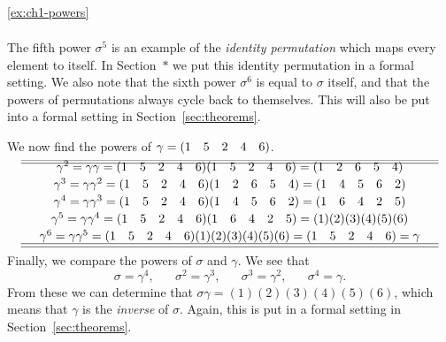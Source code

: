 \begin{solution}{\ref{ex:ch1-powers}}
{\[\begin{array}{c}
    \end{array}
    \]
    The fifth power \(\sigma^{5}\) is an example of the \textit{identity permutation} which maps every element to itself. In Section~\(*\) we put this identity permutation in a formal setting. We also note that the sixth power \(\sigma^{6}\) is equal to \(\sigma\) itself, and that the powers of permutations always cycle back to themselves. This will also be put into a formal setting in Section~\ref{sec:theorems}.

    We now find the powers of \(\gamma = (1 \quad 5 \quad 2 \quad 4 \quad 6)\).
    \[
    \begin{array}{c}\hline\\[-15pt]\hline\\[-12pt]
        \quad\gamma^{2} = \gamma\gamma = (1 \quad 5 \quad 2 \quad 4 \quad 6)(1 \quad 5 \quad 2 \quad 4 \quad 6) = (1 \quad 2 \quad 6 \quad 5 \quad 4)\quad \\[2pt]
        \quad\gamma^{3} = \gamma\gamma^{2} = (1 \quad 5 \quad 2 \quad 4 \quad 6)(1 \quad 2 \quad 6 \quad 5 \quad 4) = (1 \quad 4 \quad 5 \quad 6 \quad 2)\quad \\[2pt]
        \quad\gamma^{4} = \gamma\gamma^{3} = (1 \quad 5 \quad 2 \quad 4 \quad 6)(1 \quad 4 \quad 5 \quad 6 \quad 2) = (1 \quad 6 \quad 4 \quad 2 \quad 5)\quad \\[2pt]
        \quad\gamma^{5} = \gamma\gamma^{4} = (1 \quad 5 \quad 2 \quad 4 \quad 6)(1 \quad 6 \quad 4 \quad 2 \quad 5) = (1)(2)(3)(4)(5)(6)\quad \\[2pt]
        \quad\gamma^{6} = \gamma\gamma^{5} = (1 \quad 5 \quad 2 \quad 4 \quad 6)(1)(2)(3)(4)(5)(6) = (1 \quad 5 \quad 2 \quad 4 \quad 6) = \gamma\quad \\[2pt]
        \hline\\[-15pt]\hline
    \end{array}
    \]
    Finally, we compare the powers of \(\sigma\) and \(\gamma\). We see that
    \[
    \sigma = \gamma^{4}, \hspace{20pt} \sigma^{2} = \gamma^{3}, \hspace{20pt} \sigma^{3} = \gamma^{2}, \hspace{20pt} \sigma^{4} = \gamma.
    \]
    From these we can determine that \(\sigma\gamma = (1)(2)(3)(4)(5)(6)\), which means that \(\gamma\) is the \textit{inverse} of \(\sigma\). Again, this is put in a formal setting in Section~\ref{sec:theorems}.
}\end{solution}

